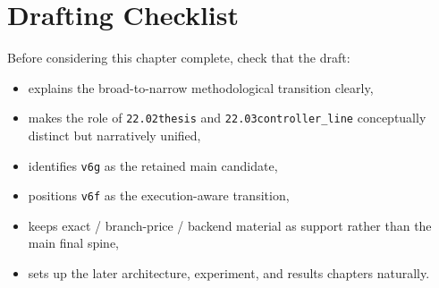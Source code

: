 \section{Drafting Checklist}
Before considering this chapter complete, check that the draft:
\begin{itemize}
    \item explains the broad-to-narrow methodological transition clearly,
    \item makes the role of \texttt{22.02thesis} and \texttt{22.03controller_line} conceptually distinct but narratively unified,
    \item identifies \texttt{v6g} as the retained main candidate,
    \item positions \texttt{v6f} as the execution-aware transition,
    \item keeps exact / branch-price / backend material as support rather than the main final spine,
    \item sets up the later architecture, experiment, and results chapters naturally.
\end{itemize}
